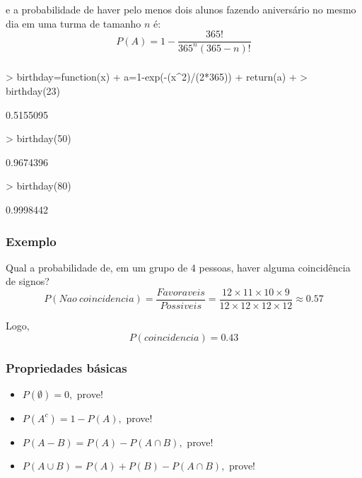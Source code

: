 \documentclass[14pt,aspectratio=1610]{beamer}
\begin{document}
\begin{frame}{}
\frametitle{}
\begin{block}{}
\justifying
e a probabilidade de haver pelo menos dois alunos fazendo aniversário no mesmo dia em uma turma de tamanho $n$ é:
$$P(A)=1-\dfrac{365!}{365^{n}(365-n)!}$$


\end{block}
\end{frame}

\begin{frame}[fragile]{}
\frametitle{}
\begin{block}{}
\justifying
\begin{Schunk}
\begin{Sinput}
> birthday=function(x){
+   a=1-exp(-(x^2)/(2*365))
+   return(a)
+ }
> birthday(23)
\end{Sinput}
\begin{Soutput}
[1] 0.5155095
\end{Soutput}
\begin{Sinput}
> birthday(50)
\end{Sinput}
\begin{Soutput}
[1] 0.9674396
\end{Soutput}
\begin{Sinput}
> birthday(80)
\end{Sinput}
\begin{Soutput}
[1] 0.9998442
\end{Soutput}
\end{Schunk}
\end{block}
\end{frame}

\begin{frame}{}
\frametitle{Exemplo}
\begin{block}{}
\justifying
Qual a probabilidade de, em um grupo de 4 pessoas, haver alguma coincidência de signos?
\pause
$$P(Nao\ coincidencia)=\dfrac{Favoraveis}{Possiveis}=\dfrac{12\times 11\times 10\times 9}{12\times 12\times 12\times 12}\approx 0.57$$

Logo, $$P(coincidencia)=0.43$$
\end{block}
\end{frame}


\begin{frame}{}
\frametitle{Propriedades básicas}
\begin{block}{}
\begin{itemize}
\item $P(\emptyset)=0,$ prove!\pause
\item $P(A^{c})=1-P(A),$ prove!\pause
\item $P(A-B)=P(A)-P(A\cap B),$ prove!\pause
\item $P(A\cup B)=P(A)+P(B)-P(A\cap B),$ prove!
\end{itemize}
\end{block}
\end{frame}
\end{document}

